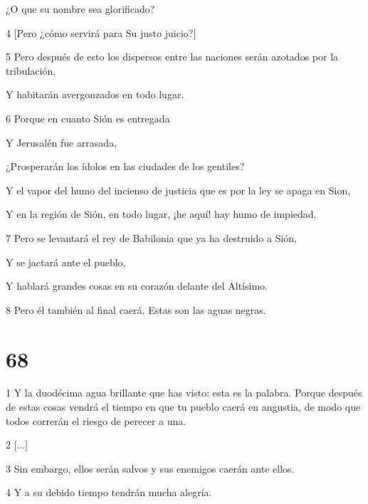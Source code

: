 \par ¿O que su nombre sea glorificado?

\par 4 [Pero ¿cómo servirá para Su justo juicio?]

\par 5 Pero después de esto los dispersos entre las naciones serán azotados por la tribulación,

\par Y habitarán avergonzados en todo lugar.

\par 6 Porque en cuanto Sión es entregada

\par Y Jerusalén fue arrasada,

\par ¿Prosperarán los ídolos en las ciudades de los gentiles?

\par Y el vapor del humo del incienso de justicia que es por la ley se apaga en Sion,

\par Y en la región de Sión, en todo lugar, ¡he aquí! hay humo de impiedad.

\par 7 Pero se levantará el rey de Babilonia que ya ha destruido a Sión,

\par Y se jactará ante el pueblo,

\par Y hablará grandes cosas en su corazón delante del Altísimo.

\par 8 Pero él también al final caerá. Estas son las aguas negras.

\chapter{68}

\par 1 Y la duodécima agua brillante que has visto: esta es la palabra. Porque después de estas cosas vendrá el tiempo en que tu pueblo caerá en angustia, de modo que todos correrán el riesgo de perecer a una.

\par 2 [...]

\par 3 Sin embargo, ellos serán salvos y sus enemigos caerán ante ellos.

\par 4 Y a su debido tiempo tendrán mucha alegría.

